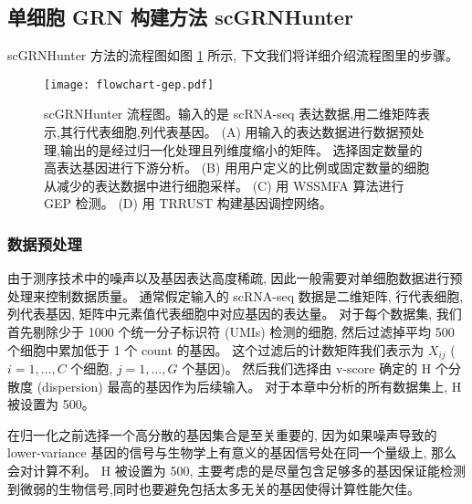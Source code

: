 \subsection{单细胞 GRN 构建方法 scGRNHunter}

scGRNHunter 方法的流程图如图 \ref{fig:gep-flowchart} 所示, 下文我们将详细介绍流程图里的步骤。
\begin{figure}[!htbp]
    \centering
    \texttt{[image: flowchart-gep.pdf]}
    \caption{
        scGRNHunter 流程图。输入的是 scRNA-seq 表达数据,用二维矩阵表示,其行代表细胞,列代表基因。
        (A) 用输入的表达数据进行数据预处理,输出的是经过归一化处理且列维度缩小的矩阵。
        选择固定数量的高表达基因进行下游分析。
        (B) 用用户定义的比例或固定数量的细胞从减少的表达数据中进行细胞采样。
        (C) 用 WSSMFA 算法进行 GEP 检测。
        (D) 用 TRRUST 构建基因调控网络。
    }
    \label{fig:gep-flowchart}
\end{figure}

\subsubsection{数据预处理}
由于测序技术中的噪声以及基因表达高度稀疏, 因此一般需要对单细胞数据进行预处理来控制数据质量。
通常假定输入的 scRNA-seq 数据是二维矩阵, 行代表细胞, 列代表基因, 矩阵中元素值代表细胞中对应基因的表达量。
对于每个数据集, 我们首先剔除少于 1000 个统一分子标识符 (UMIs) 检测的细胞,
然后过滤掉平均 500 个细胞中累加低于 1 个 count 的基因。
这个过滤后的计数矩阵我们表示为 $X_{ij}$ ($i=1,\ldots,C$ 个细胞, $j=1,\ldots,G$ 个基因)。
然后我们选择由 v-score  确定的 H 个分散度 (dispersion) 最高的基因作为后续输入。
对于本章中分析的所有数据集上, H 被设置为 500。

在归一化之前选择一个高分散的基因集合是至关重要的, 
因为如果噪声导致的 lower-variance 基因的信号与生物学上有意义的基因信号处在同一个量级上, 那么会对计算不利。 
H 被设置为 500, 主要考虑的是尽量包含足够多的基因保证能检测到微弱的生物信号,同时也要避免包括太多无关的基因使得计算性能欠佳。

